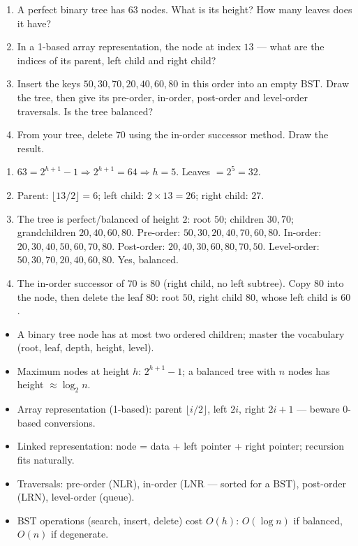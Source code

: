 \documentclass[11pt]{article}
\begin{document}
\begin{exercice}[Practice]
\begin{enumerate}
\item A perfect binary tree has $63$ nodes. What is its height? How many leaves does it have?
\item In a 1-based array representation, the node at index $13$ — what are the indices of its parent, left child and right child?
\item Insert the keys $50, 30, 70, 20, 40, 60, 80$ in this order into an empty BST. Draw the tree, then give its pre-order, in-order, post-order and level-order traversals. Is the tree balanced?
\item From your tree, delete $70$ using the in-order successor method. Draw the result.
\end{enumerate}
\end{exercice}

\begin{corrige}[Exercise n°1]
\begin{enumerate}
\item $63 = 2^{h+1}-1 \Rightarrow 2^{h+1}=64 \Rightarrow h=5$. Leaves $=2^{5}=32$.
\item Parent: $\lfloor 13/2\rfloor = 6$; left child: $2\times13=26$; right child: $27$.
\item The tree is perfect/balanced of height $2$: root $50$; children $30, 70$; grandchildren $20, 40, 60, 80$. Pre-order: $50,30,20,40,70,60,80$. In-order: $20,30,40,50,60,70,80$. Post-order: $20,40,30,60,80,70,50$. Level-order: $50,30,70,20,40,60,80$. Yes, balanced.
\item The in-order successor of $70$ is $80$ (right child, no left subtree). Copy $80$ into the node, then delete the leaf $80$: root $50$, right child $80$, whose left child is $60$.
\end{enumerate}
\end{corrige}

\begin{aretenir}
\begin{itemize}
\item A binary tree node has at most two ordered children; master the vocabulary (root, leaf, depth, height, level).
\item Maximum nodes at height $h$: $2^{h+1}-1$; a balanced tree with $n$ nodes has height $\approx \log_2 n$.
\item Array representation (1-based): parent $\lfloor i/2\rfloor$, left $2i$, right $2i+1$ — beware 0-based conversions.
\item Linked representation: node = data + left pointer + right pointer; recursion fits naturally.
\item Traversals: pre-order (NLR), in-order (LNR — sorted for a BST), post-order (LRN), level-order (queue).
\item BST operations (search, insert, delete) cost $O(h)$: $O(\log n)$ if balanced, $O(n)$ if degenerate.
\end{itemize}
\end{aretenir}
\end{document}

